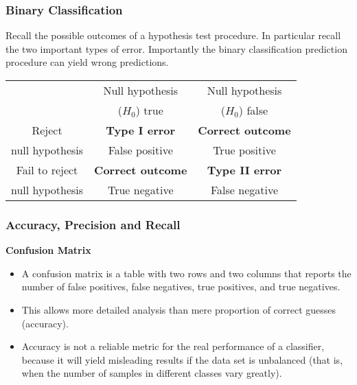 \documentclass[a4]{beamer}
\begin{document}
\begin{frame}
	\frametitle{Binary Classification}
	\large
	Recall the possible outcomes of a hypothesis test procedure. In particular recall the two important types of error. Importantly the binary classification prediction procedure can yield wrong predictions.
	\begin{center}
		\begin{tabular}{|c|c|c|} \hline
			& Null hypothesis & Null hypothesis   \\
			& ($H_0$) true	 & ($H_0$) false \\ \hline
			Reject 	       & \textbf{Type I error }   & \textbf{Correct outcome} \\
			null hypothesis& False positive  & True positive \\ \hline
			Fail to reject & \textbf{Correct outcome} & \textbf{Type II error} \\
			null hypothesis & True negative  & False negative \\ \hline
		\end{tabular} 
	\end{center}
\end{frame}
\begin{frame}
	\frametitle{Accuracy, Precision and Recall}
	\large
	\noindent \textbf{Confusion Matrix}
	\begin{itemize}
	\item A confusion matrix is a table with two rows and two columns that reports the number of false positives, false negatives, true positives, and true negatives. \item This allows more detailed analysis than mere proportion of correct guesses (accuracy). \item Accuracy is not a reliable metric for the real performance of a classifier, because it will yield misleading results if the data set is unbalanced (that is, when the number of samples in different classes vary greatly).
	\end{itemize}

\end{frame}
\end{document}
